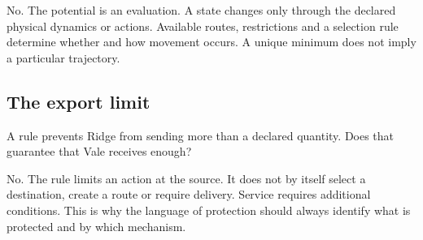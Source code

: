 No. The potential is an evaluation. A state changes only through the declared physical dynamics or actions. Available routes, restrictions and a selection rule determine whether and how movement occurs. A unique minimum does not imply a particular trajectory.

\subsection{The export limit}
A rule prevents Ridge from sending more than a declared quantity. Does that guarantee that Vale receives enough?

No. The rule limits an action at the source. It does not by itself select a destination, create a route or require delivery. Service requires additional conditions. This is why the language of protection should always identify what is protected and by which mechanism.
